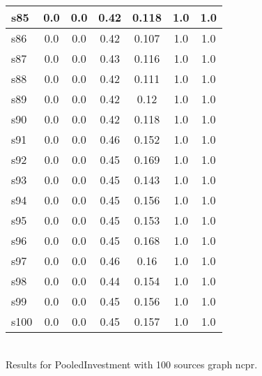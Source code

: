 \documentclass{article}
\begin{document}
\begin{tabular}{|l|c|c|c|c|c|c|}
\hline
s85 &0.0 & 0.0 & 0.42 & 0.118 & 1.0 & 1.0\\
\hline
s86 &0.0 & 0.0 & 0.42 & 0.107 & 1.0 & 1.0\\
\hline
s87 &0.0 & 0.0 & 0.43 & 0.116 & 1.0 & 1.0\\
\hline
s88 &0.0 & 0.0 & 0.42 & 0.111 & 1.0 & 1.0\\
\hline
s89 &0.0 & 0.0 & 0.42 & 0.12 & 1.0 & 1.0\\
\hline
s90 &0.0 & 0.0 & 0.42 & 0.118 & 1.0 & 1.0\\
\hline
s91 &0.0 & 0.0 & 0.46 & 0.152 & 1.0 & 1.0\\
\hline
s92 &0.0 & 0.0 & 0.45 & 0.169 & 1.0 & 1.0\\
\hline
s93 &0.0 & 0.0 & 0.45 & 0.143 & 1.0 & 1.0\\
\hline
s94 &0.0 & 0.0 & 0.45 & 0.156 & 1.0 & 1.0\\
\hline
s95 &0.0 & 0.0 & 0.45 & 0.153 & 1.0 & 1.0\\
\hline
s96 &0.0 & 0.0 & 0.45 & 0.168 & 1.0 & 1.0\\
\hline
s97 &0.0 & 0.0 & 0.46 & 0.16 & 1.0 & 1.0\\
\hline
s98 &0.0 & 0.0 & 0.44 & 0.154 & 1.0 & 1.0\\
\hline
s99 &0.0 & 0.0 & 0.45 & 0.156 & 1.0 & 1.0\\
\hline
s100 &0.0 & 0.0 & 0.45 & 0.157 & 1.0 & 1.0\\
\hline
\end{tabular}\\

\noindent Results for PooledInvestment with 100 sources graph ncpr.
\end{document}
